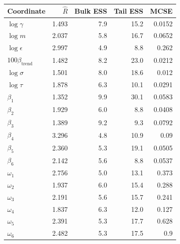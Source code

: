 \begin{tabular}{lrrrr}
\toprule
Coordinate & $\widehat R$ & Bulk ESS & Tail ESS & MCSE \\
\midrule
$\log\gamma$ & 1.493 & 7.9 & 15.2 & 0.0152 \\
$\log m$ & 2.037 & 5.8 & 16.7 & 0.0652 \\
$\log\epsilon$ & 2.997 & 4.9 & 8.8 & 0.262 \\
$100\beta_{\mathrm{trend}}$ & 1.482 & 8.2 & 23.0 & 0.0212 \\
$\log\sigma$ & 1.501 & 8.0 & 18.6 & 0.012 \\
$\log\tau$ & 1.878 & 6.3 & 10.1 & 0.0291 \\
$\beta_1$ & 1.352 & 9.9 & 30.1 & 0.0583 \\
$\beta_2$ & 1.929 & 6.0 & 8.8 & 0.0408 \\
$\beta_3$ & 1.389 & 9.2 & 9.3 & 0.0792 \\
$\beta_4$ & 3.296 & 4.8 & 10.9 & 0.09 \\
$\beta_5$ & 2.360 & 5.3 & 19.1 & 0.0505 \\
$\beta_6$ & 2.142 & 5.6 & 8.8 & 0.0537 \\
$\omega_1$ & 2.756 & 5.0 & 13.1 & 0.373 \\
$\omega_2$ & 1.937 & 6.0 & 15.4 & 0.288 \\
$\omega_3$ & 2.191 & 5.6 & 15.7 & 0.241 \\
$\omega_4$ & 1.837 & 6.3 & 12.0 & 0.127 \\
$\omega_5$ & 2.391 & 5.3 & 17.7 & 0.628 \\
$\omega_6$ & 2.482 & 5.3 & 17.5 & 0.9 \\
\bottomrule
\end{tabular}
